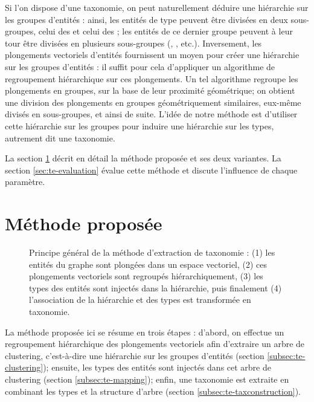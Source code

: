 
Si l'on dispose d'une taxonomie, on peut naturellement déduire une hiérarchie sur les groupes d'entités : ainsi, les entités de type  peuvent être divisées en deux sous-groupes, celui des  et celui des ; les entités de ce dernier groupe peuvent à leur tour être divisées en plusieurs sous-groupes (, , etc.). Inversement, les plongements vectoriels d'entités fournissent un moyen pour créer une hiérarchie sur les groupes d'entités : il suffit pour cela d'appliquer un algorithme de regroupement hiérarchique sur ces plongements. Un tel algorithme regroupe les plongements en groupes, sur la base de leur proximité géométrique; on obtient une division des plongements en groupes géométriquement similaires, eux-même divisés en sous-groupes, et ainsi de suite. L'idée de notre méthode est d'utiliser cette hiérarchie sur les groupes pour induire une hiérarchie sur les types, autrement dit une taxonomie.

La section \ref{sec:te-method} décrit en détail la méthode proposée et ses deux variantes. La section \ref{sec:te-evaluation} évalue cette méthode et discute l'influence de chaque paramètre.

\section{Méthode proposée}
\label{sec:te-method}

\begin{figure}[h]
    \centering
    
    \caption[Principe général de l'extraction de taxonomie]{Principe général de la méthode d'extraction de taxonomie : (1) les entités du graphe sont plongées dans un espace vectoriel, (2) ces plongements vectoriels sont regroupés hiérarchiquement, (3) les types des entités sont injectés dans la hiérarchie, puis finalement (4) l'association de la hiérarchie et des types est transformée en taxonomie.}
    \label{fig:te-summary}
\end{figure}

La méthode proposée ici se résume en trois étapes : d'abord, on effectue un regroupement hiérarchique des plongements vectoriels afin d'extraire un arbre de clustering, c'est-à-dire une hiérarchie sur les groupes d'entités (section \ref{subsec:te-clustering}); ensuite, les types des entités sont injectés dans cet arbre de clustering (section \ref{subsec:te-mapping}); enfin, une taxonomie est extraite en combinant les types et la structure d'arbre (section \ref{subsec:te-taxconstruction}). 


